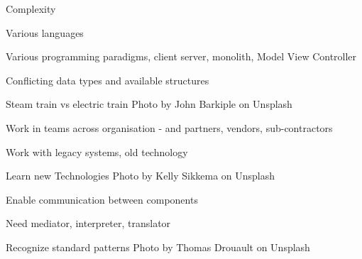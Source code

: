 \documentclass[Screen16to9,17pt]{foils}
\begin{document}


\begin{list2}
\item Complexity
\item Various languages
\item Various programming paradigms, client server, monolith, Model View Controller
\item Conflicting data types and available structures
\item Steam train vs electric train \hfill Photo by John Barkiple on Unsplash

\end{list2}






\begin{list2}
\item Work in teams across organisation - and partners, vendors, sub-contractors
\item Work with legacy systems, old technology
\item Learn new Technologies \hfill Photo by Kelly Sikkema on Unsplash
\end{list2}







\begin{list2}
\item Enable communication between components
\item Need mediator, interpreter, translator
\item Recognize standard patterns \hfill Photo by Thomas Drouault on Unsplash
\end{list2}

\end{document}
